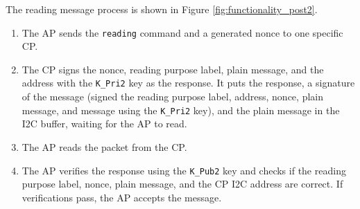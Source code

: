 \documentclass[11pt,oneside,onecolumn,letterpaper]{article}
\begin{document}
	The reading message process is shown in Figure \ref{fig:functionality_post2}.
	\begin{enumerate}
		\item The AP sends the \texttt{reading} command and a generated nonce to one specific CP.
		\item The CP signs the nonce,
		reading purpose label,
		plain message,
		and the address with the \texttt{K\_Pri2} key as the response.
		It puts the response,
		a signature of the message (signed the reading purpose label,
		address,
		nonce,
		plain message,
		and message using the \texttt{K\_Pri2} key),
		and the plain message in the I2C buffer,
		waiting for the AP to read.
		\item The AP reads the packet from the CP.
		\item The AP verifies the response using the \texttt{K\_Pub2} key and checks if the reading purpose label,
		nonce,
		plain message,
		and the CP I2C address are correct.
		If verifications pass,
		the AP accepts the message.
	\end{enumerate}
	
\end{document}

